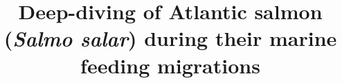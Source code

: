 %
%
%
%
%
%
\RequirePackage{fix-cm}
%
\documentclass[smallextended,referee]{svjour3}       %
%
\smartqed  %
%
\usepackage{graphicx}
%
%
\usepackage{natbib}
\usepackage{multirow}
\usepackage{float}
\usepackage[utf8]{inputenc}
\usepackage[T1, OT1]{fontenc}
%
%
%


\title{Deep-diving of Atlantic salmon (\textit{Salmo salar})  during their marine feeding migrations%
}

